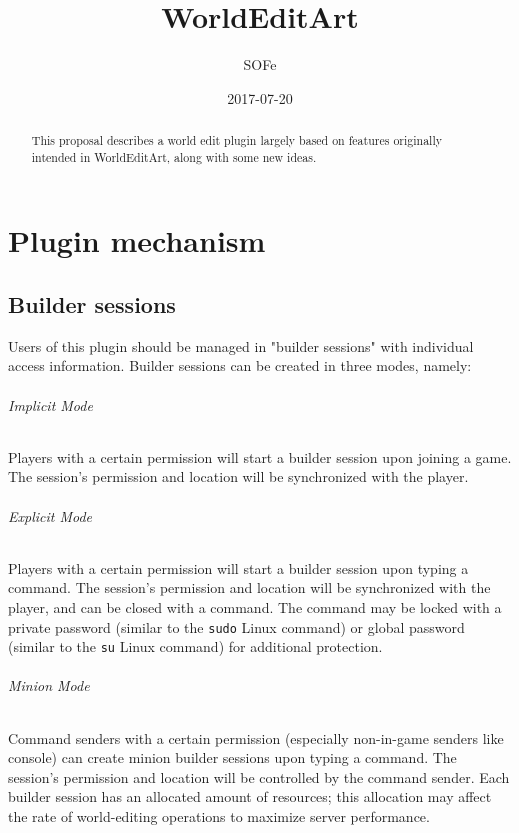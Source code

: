 \documentclass{report}
\title{WorldEditArt}
\date{2017-07-20}
\author{SOFe}
\begin{document}
	\maketitle
	\tableofcontents

	\begin{abstract}
		This proposal describes a world edit plugin largely based on features originally intended in WorldEditArt,
		along with some new ideas.
	\end{abstract}

	\part{Plugin mechanism}
		\chapter{Builder sessions}
			Users of this plugin should be managed in "builder sessions" with individual access information. Builder
			sessions can be created in three modes, namely:
			\paragraph{Implicit Mode}
				Players with a certain permission will start a builder session upon joining a game. The session's permission
				and location will be synchronized with the player.
			\paragraph{Explicit Mode}
				Players with a certain permission will start a builder session upon typing a command. The session's
				permission and location will be synchronized with the player, and can be closed with a command. The command
				may be locked with a private password (similar to the \texttt{sudo} Linux command) or global password
				(similar to the \texttt{su} Linux command) for additional protection.
			\paragraph{Minion Mode}
				Command senders with a certain permission (especially non-in-game senders like console) can create minion
				builder sessions upon typing a command. The session's permission and location will be controlled by the
				command sender.
			Each builder session has an allocated amount of resources; this allocation may affect the rate of world-editing
			operations to maximize server performance.
\end{document}
